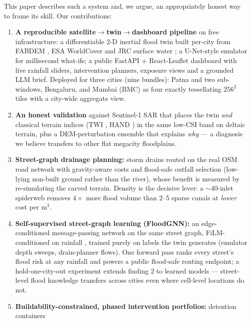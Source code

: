 \documentclass[10pt]{article}
\begin{document}
This paper describes such a system and, we argue, an appropriately honest way to frame its skill.
Our contributions:
\begin{enumerate}\itemsep2pt
  \item \textbf{A reproducible satellite$\to$twin$\to$dashboard pipeline} on free infrastructure:
        a differentiable 2-D inertial flood twin \citep{bates2010} built per-city from FABDEM
        \citep{hawker2022fabdem}, ESA WorldCover \citep{zanaga2021worldcover} and JRC surface water
        \citep{pekel2016}; a U-Net-style emulator \citep{ronneberger2015} for millisecond what-ifs;
        a public FastAPI + React-Leaflet dashboard with live rainfall sliders, intervention
        planners, exposure views and a grounded LLM brief. Deployed for three cities (nine
        bundles): Patna and two sub-windows, Bengaluru, and Mumbai (BMC) as four exactly
        tessellating $256^2$ tiles with a city-wide aggregate view.
  \item \textbf{An honest validation} against Sentinel-1 SAR \citep{torres2012} that places the
        twin \emph{and} classical terrain indices (TWI \citep{beven1979}, HAND \citep{renno2008})
        in the same low-CSI band on deltaic terrain, plus a DEM-perturbation ensemble that explains
        \emph{why} --- a diagnosis we believe transfers to other flat megacity floodplains.
  \item \textbf{Street-graph drainage planning:} storm drains routed on the real OSM road network
        \citep{osm} with gravity-aware costs and flood-safe outfall selection (low-lying non-built
        ground rather than the river), whose benefit is measured by re-simulating the carved
        terrain. Density is the decisive lever: a $\sim$40-inlet spiderweb removes $4\times$ more
        flood volume than 2--5 sparse canals at \emph{lower} cost per m$^3$.
  \item \textbf{Self-supervised street-graph learning (FloodGNN):} an edge-conditioned
        message-passing network \citep{gilmer2017} on the same street graph, FiLM-conditioned on
        rainfall \citep{perez2018film}, trained purely on labels the twin generates (emulator depth
        sweeps, drain-planner flows). One forward pass ranks every street's flood risk at any
        rainfall and powers a public flood-safe routing endpoint; a hold-one-city-out experiment
        extends finding 2 to learned models --- street-level flood knowledge transfers across
        cities even where cell-level locations do not.
  \item \textbf{Buildability-constrained, phased intervention portfolios:} detention containers

\end{enumerate}
\end{document}
